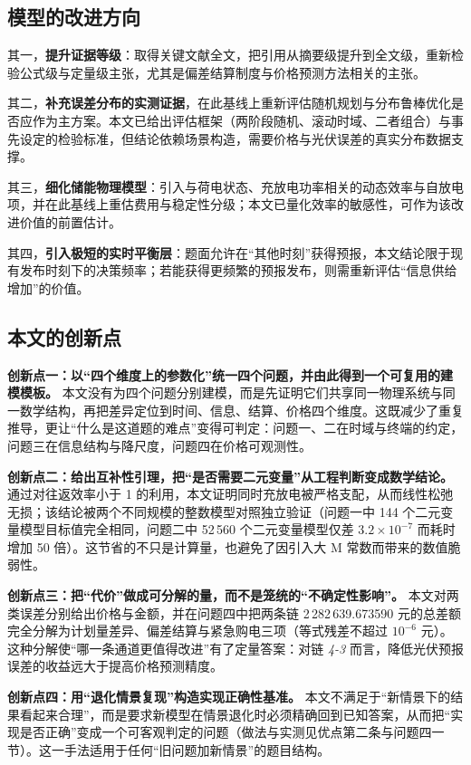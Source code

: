 \subsection{模型的改进方向}

其一，\textbf{提升证据等级}：取得关键文献全文，把引用从摘要级提升到全文级，重新检验公式级与定量级主张，尤其是偏差结算制度与价格预测方法相关的主张。

其二，\textbf{补充误差分布的实测证据}，在此基线上重新评估随机规划与分布鲁棒优化是否应作为主方案。本文已给出评估框架（两阶段随机、滚动时域、二者组合）与事先设定的检验标准，但结论依赖场景构造，需要价格与光伏误差的真实分布数据支撑。

其三，\textbf{细化储能物理模型}：引入与荷电状态、充放电功率相关的动态效率与自放电项，并在此基线上重估费用与稳定性分级；本文已量化效率的敏感性，可作为该改进价值的前置估计。

其四，\textbf{引入极短的实时平衡层}：题面允许在“其他时刻”获得预报，本文结论限于现有发布时刻下的决策频率；若能获得更频繁的预报发布，则需重新评估“信息供给增加”的价值。

\subsection{本文的创新点}

\textbf{创新点一：以“四个维度上的参数化”统一四个问题，并由此得到一个可复用的建模模板。} 本文没有为四个问题分别建模，而是先证明它们共享同一物理系统与同一数学结构，再把差异定位到时间、信息、结算、价格四个维度。这既减少了重复推导，更让“什么是这道题的难点”变得可判定：问题一、二在时域与终端的约定，问题三在信息结构与降尺度，问题四在价格可观测性。

\textbf{创新点二：给出互补性引理，把“是否需要二元变量”从工程判断变成数学结论。} 通过对往返效率小于 1 的利用，本文证明同时充放电被严格支配，从而线性松弛无损；该结论被两个不同规模的整数模型对照独立验证（问题一中 144 个二元变量模型目标值完全相同，问题二中 52\,560 个二元变量模型仅差 $3.2\times10^{-7}$ 而耗时增加 50 倍）。这节省的不只是计算量，也避免了因引入大 M 常数而带来的数值脆弱性。

\textbf{创新点三：把“代价”做成可分解的量，而不是笼统的“不确定性影响”。} 本文对两类误差分别给出价格与金额，并在问题四中把两条链 2\,282\,639.673590 元的总差额完全分解为计划量差异、偏差结算与紧急购电三项（等式残差不超过 $10^{-6}$ 元）。这种分解使“哪一条通道更值得改进”有了定量答案：对链 \emph{4-3} 而言，降低光伏预报误差的收益远大于提高价格预测精度。

\textbf{创新点四：用“退化情景复现”构造实现正确性基准。} 本文不满足于“新情景下的结果看起来合理”，而是要求新模型在情景退化时必须精确回到已知答案，从而把“实现是否正确”变成一个可客观判定的问题（做法与实测见优点第二条与问题四一节）。这一手法适用于任何“旧问题加新情景”的题目结构。

